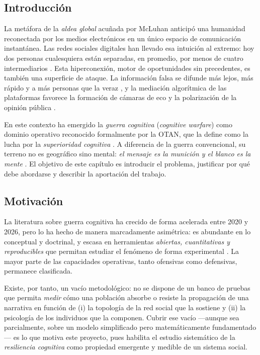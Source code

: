 \documentclass[12pt]{extarticle}
\numberwithin{equation}{section}
\begin{document}
\begin{refsection}
\section{Introducci\'on}

La met\'afora de la \emph{aldea global} acu\~nada por McLuhan \cite{McLuhan1964} anticip\'o una humanidad reconectada por los medios electr\'onicos en un \'unico espacio de comunicaci\'on instant\'anea. Las redes sociales digitales han llevado esa intuici\'on al extremo: hoy dos personas cualesquiera est\'an separadas, en promedio, por menos de cuatro intermediarios \cite{Backstrom2012}. Esta hiperconexi\'on, motor de oportunidades sin precedentes, es tambi\'en una superficie de ataque. La informaci\'on falsa se difunde m\'as lejos, m\'as r\'apido y a m\'as personas que la veraz \cite{Vosoughi2018}, y la mediaci\'on algor\'itmica de las plataformas favorece la formaci\'on de c\'amaras de eco y la polarizaci\'on de la opini\'on p\'ublica \cite{DelVicario2016}.

En este contexto ha emergido la \emph{guerra cognitiva} (\emph{cognitive warfare}) como dominio operativo reconocido formalmente por la OTAN, que la define como la lucha por la \emph{superioridad cognitiva} \cite{NATOChiefScientist2025}. A diferencia de la guerra convencional, su terreno no es geogr\'afico sino mental: \emph{el mensaje es la munici\'on y el blanco es la mente} \cite{Hoffman2025}. El objetivo de este cap\'itulo es introducir el problema, justificar por qu\'e debe abordarse y describir la aportaci\'on del trabajo.

\subsection{Motivaci\'on}

La literatura sobre guerra cognitiva ha crecido de forma acelerada entre 2020 y 2026, pero lo ha hecho de manera marcadamente asim\'etrica: es abundante en lo conceptual y doctrinal, y escasa en herramientas \emph{abiertas, cuantitativas y reproducibles} que permitan estudiar el fen\'omeno de forma experimental \cite{DeppeSchaal2024}. La mayor parte de las capacidades operativas, tanto ofensivas como defensivas, permanece clasificada.

Existe, por tanto, un vac\'io metodol\'ogico: no se dispone de un banco de pruebas que permita \emph{medir} c\'omo una poblaci\'on absorbe o resiste la propagaci\'on de una narrativa en funci\'on de (i) la topolog\'ia de la red social que la sostiene y (ii) la psicolog\'ia de los individuos que la componen. Cubrir ese vac\'io —aunque sea parcialmente, sobre un modelo simplificado pero matem\'aticamente fundamentado— es lo que motiva este proyecto, pues habilita el estudio sistem\'atico de la \emph{resiliencia cognitiva} como propiedad emergente y medible de un sistema social.


\end{refsection}
\end{document}
